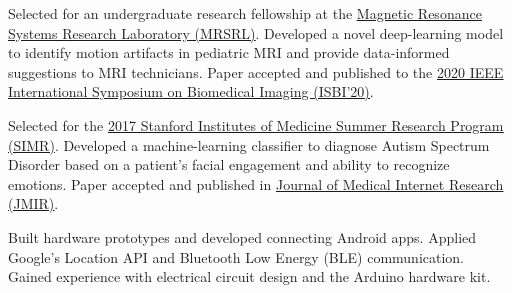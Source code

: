 \documentclass[]{deedy-resume-openfont}
\begin{document}
\begin{minipage}[t]{0.66\textwidth}
\begin{tightemize}\item Selected for an undergraduate research fellowship at the \href{https://mrsrl.sites.stanford.edu/}{\uline{Magnetic Resonance Systems Research Laboratory (MRSRL)}}. Developed a novel deep-learning model to identify motion artifacts in pediatric MRI and provide data-informed suggestions to MRI technicians. Paper accepted and published to the \href{http://2020.biomedicalimaging.org/}{\uline{2020 IEEE International Symposium on Biomedical Imaging (ISBI’20)}}.
\end{tightemize}
\sectionsep


\begin{tightemize}
\item Selected for the \href{https://simr.stanford.edu/}{\uline{2017 Stanford Institutes of Medicine Summer Research Program (SIMR)}}. Developed a machine-learning classifier to diagnose Autism Spectrum Disorder based on a patient’s facial engagement and ability to recognize emotions. Paper accepted and published in \href{https://www.jmir.org/2020/4/e13810/}{\uline{Journal of Medical Internet Research (JMIR)}}.\end{tightemize}
\sectionsep


\begin{tightemize}
\item Built hardware prototypes and developed connecting Android apps. Applied Google’s Location API and Bluetooth Low Energy (BLE) communication. Gained experience with electrical circuit design and the Arduino hardware kit.\end{tightemize}



\end{minipage}
\end{document}
